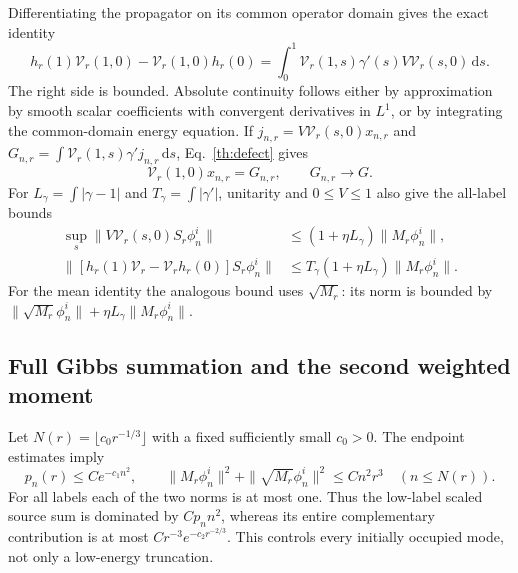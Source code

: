 \documentclass[aps,prl,reprint,superscriptaddress,longbibliography]{revtex4-2}
\newcommand{\dd}{\mathrm{d}}
\begin{document}
Differentiating the propagator on its common operator domain gives the exact identity
\begin{equation}
 h_r(1)\mathcal V_r(1,0)-\mathcal V_r(1,0)h_r(0)
 =\int_0^1\mathcal V_r(1,s)\gamma'(s)V\mathcal V_r(s,0)\,\dd s.
 \label{th:defect}
\end{equation}
The right side is bounded. Absolute continuity follows either by approximation by smooth scalar coefficients with convergent derivatives in $L^1$, or by integrating the common-domain energy equation. If $j_{n,r}=V\mathcal V_r(s,0)x_{n,r}$ and $G_{n,r}=\int\mathcal V_r(1,s)\gamma'j_{n,r}\,\dd s$, Eq.~\eqref{th:defect} gives
\begin{equation}
 [h_r(1)-\lambda_{n,r}]\mathcal V_r(1,0)x_{n,r}=G_{n,r},
 \qquad G_{n,r}\to G.
 \label{th:sourceid}
\end{equation}
For $L_\gamma=\int|\gamma-1|$ and $T_\gamma=\int|\gamma'|$, unitarity and $0\le V\le1$ also give the all-label bounds
\begin{align}
 \sup_s\|V\mathcal V_r(s,0)S_r\phi_n^i\|
 &\le(1+\eta L_\gamma)\|M_r\phi_n^i\|,\nonumber\\
 \|[h_r(1)\mathcal V_r-\mathcal V_rh_r(0)]S_r\phi_n^i\|
 &\le T_\gamma(1+\eta L_\gamma)\|M_r\phi_n^i\|.
 \label{th:alllabel}
\end{align}
For the mean identity the analogous bound uses $\sqrt{M_r}$: its norm is bounded by $\|\sqrt{M_r}\phi_n^i\|+\eta L_\gamma\|M_r\phi_n^i\|$.

\subsection{Full Gibbs summation and the second weighted moment}

Let $N(r)=\lfloor c_0r^{-1/3}\rfloor$ with a fixed sufficiently small $c_0>0$. The endpoint estimates imply
\begin{equation}
 p_n(r)\le C e^{-c_1 n^2},\qquad
 \|M_r\phi_n^i\|^2+\|\sqrt{M_r}\phi_n^i\|^2\le C n^2r^3
 \quad(n\le N(r)). \label{th:dom}
\end{equation}
For all labels each of the two norms is at most one. Thus the low-label scaled source sum is dominated by $Cp_nn^2$, whereas its entire complementary contribution is at most $Cr^{-3}e^{-c_2r^{-2/3}}$. This controls every initially occupied mode, not only a low-energy truncation.
\end{document}
